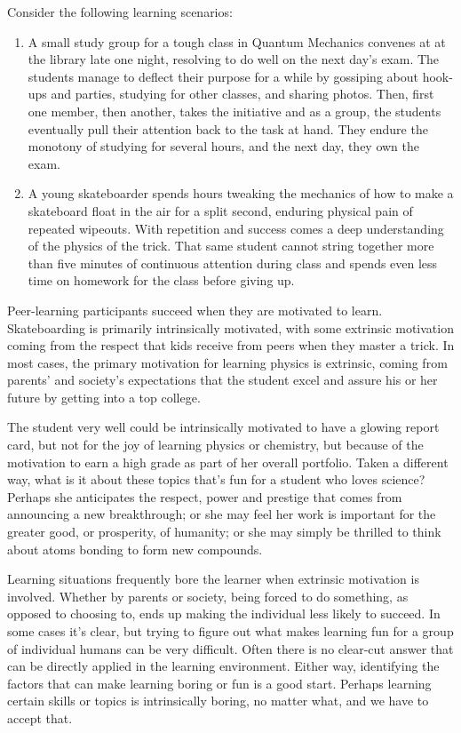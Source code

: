 Consider the following learning scenarios:

\begin{enumerate}
\itemsep1pt\parskip0pt
\item
  A small study group for a tough class in Quantum Mechanics convenes at
  at the library late one night, resolving to do well on the next day's
  exam. The students manage to deflect their purpose for a while by
  gossiping about hook-ups and parties, studying for other classes, and
  sharing photos. Then, first one member, then another, takes the
  initiative and as a group, the students eventually pull their
  attention back to the task at hand. They endure the monotony of
  studying for several hours, and the next day, they own the exam.
\item
  A young skateboarder spends hours tweaking the mechanics of how to
  make a skateboard float in the air for a split second, enduring
  physical pain of repeated wipeouts. With repetition and success comes
  a deep understanding of the physics of the trick. That same student
  cannot string together more than five minutes of continuous attention
  during class and spends even less time on homework for the class
  before giving up.
\end{enumerate}

Peer-learning participants succeed when they are motivated to learn.
Skateboarding is primarily intrinsically motivated, with some extrinsic
motivation coming from the respect that kids receive from peers when
they master a trick. In most cases, the primary motivation for learning
physics is extrinsic, coming from parents' and society's expectations
that the student excel and assure his or her future by getting into a
top college.

The student very well could be intrinsically motivated to have a glowing
report card, but not for the joy of learning physics or chemistry, but
because of the motivation to earn a high grade as part of her overall
portfolio. Taken a different way, what is it about these topics that's
fun for a student who loves science? Perhaps she anticipates the
respect, power and prestige that comes from announcing a new
breakthrough; or she may feel her work is important for the greater
good, or prosperity, of humanity; or she may simply be thrilled to think
about atoms bonding to form new compounds.

Learning situations frequently bore the learner when extrinsic
motivation is involved. Whether by parents or society, being forced to
do something, as opposed to choosing to, ends up making the individual
less likely to succeed. In some cases it's clear, but trying to figure
out what makes learning fun for a group of individual humans can be very
difficult. Often there is no clear-cut answer that can be directly
applied in the learning environment. Either way, identifying the factors
that can make learning boring or fun is a good start. Perhaps learning
certain skills or topics is intrinsically boring, no matter what, and we
have to accept that.

